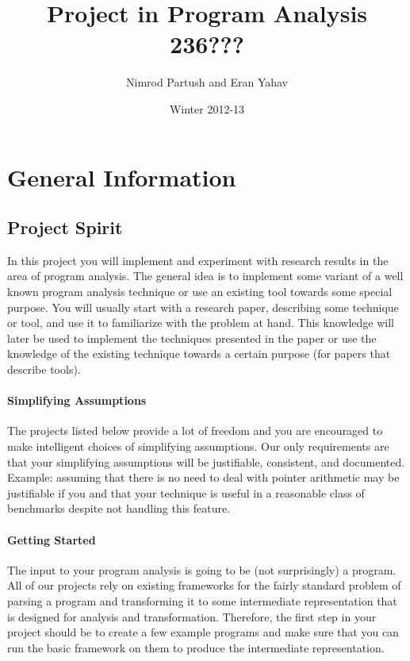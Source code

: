 \documentclass[english]{article}
\begin{document}
\title{Project in Program Analysis 236???}
\author{Nimrod Partush and Eran Yahav\\}
\date{Winter 2012-13}
\maketitle

\section{General Information}

\subsection{Project Spirit}
In this project you will implement and experiment with research results in the area of program analysis. The general idea is to implement some variant of a well known program analysis technique or use an existing tool towards some special purpose. You will usually start with a research paper, describing some technique or tool, and use it to familiarize with the problem at hand. This knowledge will later be used to implement the techniques presented in the paper or use the knowledge of the existing technique towards a certain purpose (for papers that describe tools).
\paragraph{Simplifying Assumptions} The projects listed below provide a lot of freedom and you are encouraged to make intelligent choices of simplifying assumptions. Our only requirements are that your simplifying assumptions will be justifiable, consistent, and documented. Example: assuming that there is no need to deal with pointer arithmetic may be justifiable if you and that your technique is useful in a reasonable class of benchmarks despite not handling this feature.
\paragraph{Getting Started} The input to your program analysis is going to be (not surprisingly) a program. All of our projects rely on existing frameworks for the fairly standard problem of parsing a program and transforming it to some intermediate representation that is designed for analysis and transformation. Therefore, the first step in your project should be to create a few example programs and make sure that you can run the basic framework on them to produce the intermediate representation.
\end{document}
